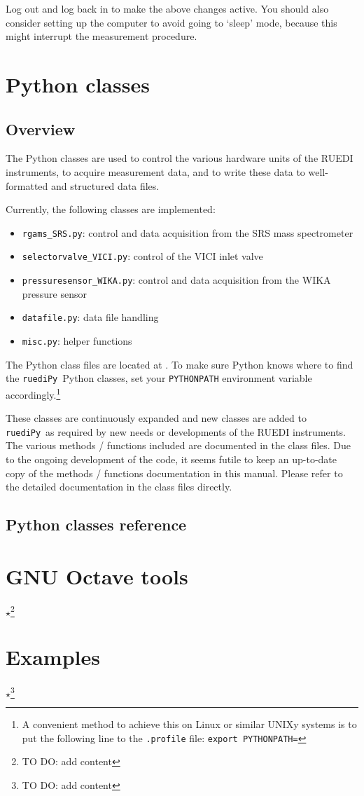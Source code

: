 \documentclass[12pt]{article}   	%
\newcommand{\ruediPy}{\texttt{ruediPy}}
\newcommand{\work}[1]{{\Large\bf\ensuremath{\star}}\footnote{TO DO: #1}}
\begin{document}
Log out and log back in to make the above changes active. You should also consider setting up the computer to avoid going to `sleep' mode, because this might interrupt the measurement procedure.

\section{Python classes}
\subsection{Overview}
The Python classes are used to control the various hardware units of the RUEDI instruments, to acquire measurement data, and to write these data to well-formatted and structured data files.\par

Currently, the following classes are implemented:
\begin{itemize}
\item \texttt{rgams\_SRS.py}: control and data acquisition from the SRS mass spectrometer
\item \texttt{selectorvalve\_VICI.py}: control of the VICI inlet valve
\item \texttt{pressuresensor\_WIKA.py}: control and data acquisition from the WIKA pressure sensor
\item \texttt{datafile.py}: data file handling
\item \texttt{misc.py}: helper functions
\end{itemize}


The Python class files are located at . To make sure Python knows where to find the \ruediPy\ Python classes, set your \texttt{PYTHONPATH} environment variable accordingly.\footnote{A convenient method to achieve this on Linux or similar UNIXy systems is to put the following line to the \texttt{.profile} file: 
 \texttt{export PYTHONPATH=}}

These classes are continuously expanded and new classes are added to \ruediPy\ as required by new needs or developments of the RUEDI instruments. The various methods / functions included are documented in the class files. Due to the ongoing development of the code, it seems futile to keep an up-to-date copy of the methods / functions documentation in this manual. Please refer to the detailed documentation in the class files directly.

\subsection{Python classes reference}


\section{GNU Octave tools}
\work{add content}

\section{Examples}
\work{add content}


\end{document}
